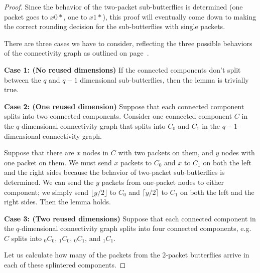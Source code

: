\documentclass[12pt]{article}
\begin{document}
\begin{proof}
Since the behavior of the two-packet sub-butterflies is determined
(one packet goes to $x0*$, one to $x1*$),
this proof will eventually come down to making the correct 
rounding decision for the sub-butterflies with single packets.

There are three cases we have to consider, reflecting the three
possible behaviors of the connectivity graph as outlined on 
page~\pageref{three cases}.

\textbf{Case 1:  (No reused dimensions)}  If the connected components don't
split between the $q$ and $q-1$ dimensional sub-butterflies,
then the lemma is trivially true.

\textbf{Case 2:  (One reused dimension)}  Suppose that each connected component
splits into two connected components.  Consider one connected component
$C$ in the $q$-dimensional connectivity graph that splits into 
$C_{0}$ and $C_{1}$ in the $q-1$-dimensional connectivity graph.

Suppose that there are
$x$ nodes in $C$ with two packets on them, and $y$ nodes with one 
packet on them.  We must send $x$ packets to $C_{0}$ and $x$ to $C_{1}$
on both the left and the right sides
because the behavior of two-packet sub-butterflies is determined.
We can send the $y$ packets from one-packet nodes to either component;
we simply send
$\lfloor y/2 \rfloor$ to $C_{0}$ and $\lceil y/2 \rceil$ to $C_{1}$
on both the left and the right sides.  Then the lemma holds.

\textbf{Case 3:  (Two reused dimensions)} Suppose that each connected
component in the $q$-dimensional connectivity graph splits into four
connected components, e.g. $C$ splits into $_{0}C_{0}$, $_{1}C_{0}$, 
$_{0}C_{1}$, and $_{1}C_{1}$.  


Let us calculate how many
of the packets from the 2-packet butterflies arrive in each of these
splintered components.  


\end{proof}
\end{document}
